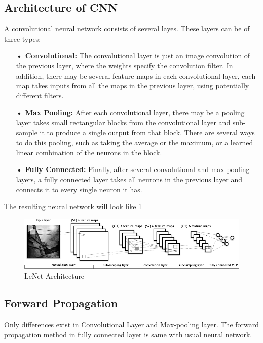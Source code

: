 \documentclass[UTF8]{ctexart}
\begin{document}
\subsection{Architecture of CNN}
A convolutional neural network consists of several layes. These layers can be of three types:
\begin{itemize}
\item[\textbf{• Convolutional:}] The convolutional layer is just an image convolution of the 
previous layer, where the weights specify the convolution filter. In addition, there may be
several feature maps in each convolutional layer, each map takes inputs from all the maps in
the previous layer, using potentially different filters.

\item[\textbf{• Max Pooling:}] After each convolutional layer, there may be a pooling layer
takes small rectangular blocks from the convolutional layer and sub-sample it to produce a 
single output from that block. There are several ways to do this pooling, such as taking the 
average or the maximum, or a learned linear combination of the neurons in the block.

\item[\textbf{• Fully Connected:}] Finally, after several convolutional and max-pooling layers,
a fully connected layer takes all neurons in the previous layer and connects it to every single 
neuron it has.
 
\end{itemize}

\par
The resulting neural network will look like \ref{Fig:LeNet}
\\
\begin{figure}[h!] 
    \centering     
    \includegraphics[width=1.2\textwidth]{LeNet}   
    \caption{\label{Fig:LeNet}LeNet Architecture} 
\end{figure}

\subsection{Forward Propagation}
Only differences exist in Convolutional Layer and Max-pooling layer. The forward propagation 
method in fully connected layer is same with usual neural network.
\end{document}
